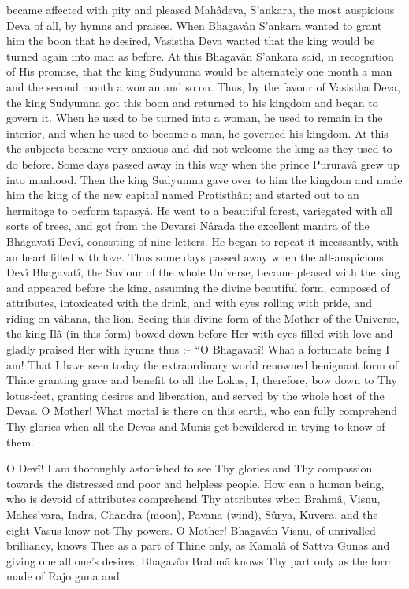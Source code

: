became affected with pity and pleased Mahâdeva, S’ankara, the most auspicious Deva of all, by hymns and praises. When Bhagavân S’ankara wanted to grant him the boon that he desired, Vasistha Deva wanted that the king would be turned again into man as before. At this Bhagavân S’ankara said, in recognition of His promise, that the king Sudyumna would be alternately one month a man and the second month a woman and so on. Thus, by the favour of Vasistha Deva, the king Sudyumna got this boon and returned to his kingdom and began to govern it. When he used to be turned into a woman, he used to remain in the interior, and when he used to become a man, he governed his kingdom. At this the subjects became very anxious and did not welcome the king as they used to do before. Some days passed away in this way when the prince Pururavâ grew up into manhood. Then the king Sudyumna gave over to him the kingdom and made him the king of the new capital named Pratisthân; and started out to an hermitage to perform tapasyâ. He went to a beautiful forest, variegated with all sorts of trees, and got from the Devarsi Nârada the excellent mantra of the Bhagavatî Devî, consisting of nine letters. He began to repeat it incessantly, with an heart filled with love. Thus some days passed away when the all-auspicious Devî Bhagavatî, the Saviour of the whole Universe, became pleased with the king and appeared before the king, assuming the divine beautiful form, composed of attributes, intoxicated with the drink, and with eyes rolling with pride, and riding on vâhana, the lion. Seeing this divine form of the Mother of the Universe, the king Ilâ (in this form) bowed down before Her with eyes filled with love and gladly praised Her with hymns thus :-- “O Bhagavatî! What a fortunate being I am! That I have seen today the extraordinary world renowned benignant form of Thine granting grace and benefit to all the Lokas, I, therefore, bow down to Thy lotus-feet, granting desires and liberation, and served by the whole host of the Devas. O Mother! What mortal is there on this earth, who can fully comprehend Thy glories when all the Devas and Munis get bewildered in trying to know of them.

 

O Devî! I am thoroughly astonished to see Thy glories and Thy compassion towards the distressed and poor and helpless people. How can a human being, who is devoid of attributes comprehend Thy attributes when Brahmâ, Visnu, Mahes'vara, Indra, Chandra (moon), Pavana (wind), Sûrya, Kuvera, and the eight Vasus know not Thy powers. O Mother! Bhagavân Visnu, of unrivalled brilliancy, knows Thee as a part of Thine only, as Kamalâ of Sattva Gunas and giving one all one's desires; Bhagavân Brahmâ knows Thy part only as the form made of Rajo guna and

